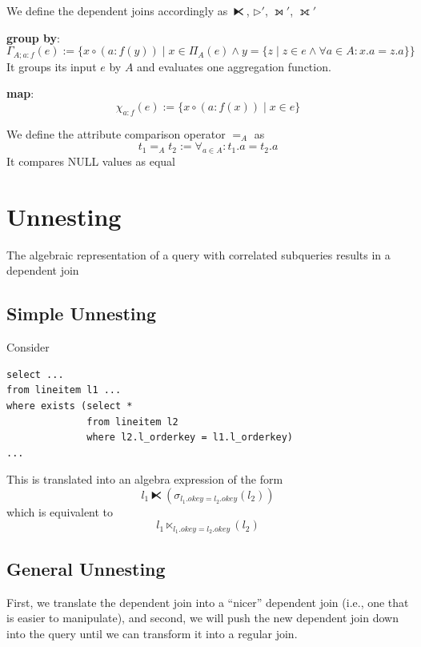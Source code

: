 \documentclass[11pt]{article}
\begin{document}
We define the dependent joins accordingly as \(\lftimes\), \(\rhd'\), \(\leftouterjoin'\), \(\fullouterjoin'\)

\textbf{group by}:
\begin{equation*}
\Gamma_{A;a:f}(e):=\{x\circ(a:f(y))\mid x\in\Pi_A(e)\wedge y=\{z\mid z\in e\wedge\forall a\in A:x.a=z.a\}\}
\end{equation*}
It groups its input \(e\) by \(A\) and evaluates one aggregation function.

\textbf{map}:
\begin{equation*}
\chi_{a:f}(e):=\{x\circ(a:f(x))\mid x\in e\}
\end{equation*}

We define the attribute comparison operator \(=_A\) as
\begin{equation*}
t_1=_At_2:=\forall_{a\in A}:t_1.a=t_2.a
\end{equation*}
It compares NULL values as equal
\section{Unnesting}
\label{sec:orgc466b44}
The algebraic representation of a query with correlated subqueries results in a dependent join
\subsection{Simple Unnesting}
\label{sec:orgdca06e3}
Consider
\begin{verbatim}
select ...
from lineitem l1 ...
where exists (select *
              from lineitem l2
              where l2.l_orderkey = l1.l_orderkey)
...
\end{verbatim}
This is translated into an algebra expression of the form
\begin{equation*}
l_1\lftimes(\sigma_{l_1.okey=l_2.okey}(l_2))
\end{equation*}
which is equivalent to
\begin{equation*}
l_1\ltimes_{l_1.okey=l_2.okey}(l_2)
\end{equation*}
\subsection{General Unnesting}
\label{sec:org8d0f0d1}
First, we translate the dependent join into a “nicer” dependent join (i.e., one that is easier to
manipulate), and second, we will push the new dependent join down into the query until we can
transform it into a regular join.
\end{document}
